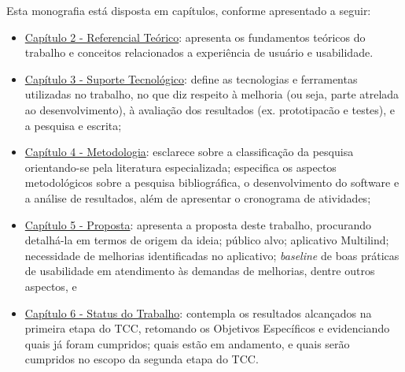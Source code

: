 \begin{description}
    \item Esta monografia está disposta em capítulos, conforme apresentado a seguir:
          \begin{itemize}
              \item \hyperref[chap:Referencial]{Capítulo 2 - Referencial Teórico}: apresenta os fundamentos teóricos do trabalho e conceitos relacionados a experiência de usuário e usabilidade.

              \item \hyperref[chap:ReferencialTech]{Capítulo 3 - Suporte Tecnológico}: define as tecnologias e ferramentas utilizadas no trabalho, no que diz respeito à melhoria (ou seja, parte
              atrelada ao desenvolvimento), à avaliação dos resultados (ex. prototipacão e testes), e a pesquisa e escrita;

              \item \hyperref[chap:Metodologia]{Capítulo 4 - Metodologia}: esclarece sobre a classificação da pesquisa orientando-se pela literatura especializada; especifica os aspectos
              metodológicos sobre a pesquisa bibliográfica, o desenvolvimento do software e a análise de resultados, além de apresentar o cronograma de atividades;

              \item \hyperref[chap:Proposta]{Capítulo 5 - Proposta}: apresenta a proposta deste trabalho, procurando detalhá-la em termos de origem da ideia; público alvo; aplicativo Multilind;
              necessidade de melhorias identificadas no aplicativo; \textit{baseline} de boas práticas de usabilidade em atendimento às demandas de melhorias, dentre
              outros aspectos, e

              \item \hyperref[chap:Status]{Capítulo 6 - Status do Trabalho}: contempla os resultados alcançados na primeira etapa do TCC, retomando os Objetivos Específicos e evidenciando quais já foram
              cumpridos; quais estão em andamento, e quais serão cumpridos no escopo da segunda etapa do TCC.
          \end{itemize}
\end{description}